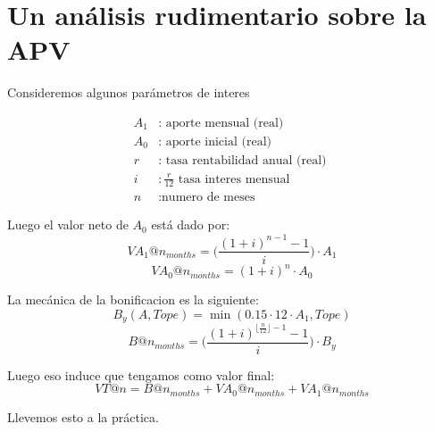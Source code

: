 \section{Un análisis rudimentario sobre la APV}
Consideremos algunos parámetros de interes

\begin{align}
    A_1 &: \text{ aporte mensual (real) } \\
    A_0 &: \text{ aporte inicial (real) } \\
    r &: \text{ tasa rentabilidad anual (real) } \\
    i &: \frac{r}{12} \text{ tasa interes mensual } \\
    n &: \text{numero de meses }
\end{align}

Luego el valor neto de $A_0$ está dado por:
$$ VA_1 @ n_{months} = \Big(  \frac{(1+i)^{n-1} - 1}{i}\Big) \cdot A_1 $$
$$ VA_0 @ n_{months} = (1+i)^n \cdot A_0 $$

La mecánica de la bonificacion es la siguiente:
$$ B_y(A, Tope) = \min( 0.15 \cdot 12 \cdot A_1, Tope) $$
$$ B @ n_{months} = \Big(  \frac{(1+i)^{\lfloor \frac{n}{12} \rfloor - 1} - 1}{i} \Big) \cdot B_y $$

Luego eso induce que tengamos como valor final:
$$ VT@n = B@n_{months} + VA_0 @ n_{months} + VA_1 @ n_{months} $$

Llevemos esto a la práctica.